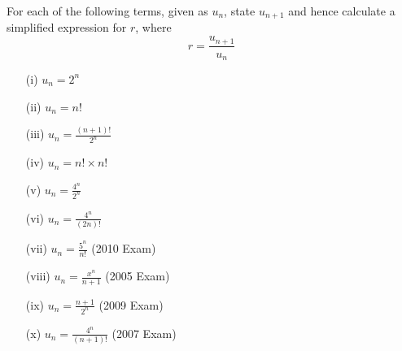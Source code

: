 \documentclass[]{article}
\begin{document}
For each of the following terms, given as $u_n$, state $u_{n+1}$ and hence calculate a simplified expression for $r$, where 
{
	\Large
\[ r = \frac{u_{n+1}}{u_n}\]
}
{
	\Large
\begin{multicols}{2}
\begin{itemize}

	
	
	\item[(i)]	$u_n= 2^n$\smallskip
	
		\item[(ii)] $u_n=n!$\smallskip
	
	\item[(iii)] $u_n = \displaystyle{\frac{(n+1)!}{2^n}} $\smallskip
	
		\item[(iv)] $u_n = n! \times n! $
	
\item[(v)]	$u_n = \displaystyle{\frac{4^n}{2^n}} $
	
	
	\item[(vi)]$u_n = \displaystyle{\frac{4^n}{(2n)!}} $
	
	
	\item[(vii)]$u_n = \displaystyle{\frac{5^n}{n!} }$ (2010 Exam)
	
	
	\item[(viii)]$u_n = \displaystyle{\frac{x^n}{n+1} }$ (2005 Exam)
	
	\item[(ix)]$u_n =\displaystyle{ \frac{n+1}{2^n}} $ (2009 Exam)
	
	\item[(x)]$u_n = \displaystyle{\frac{4^n}{(n+1)!}} $ (2007 Exam)
\end{itemize}
\end{multicols}
\smallskip
}
\end{document}
